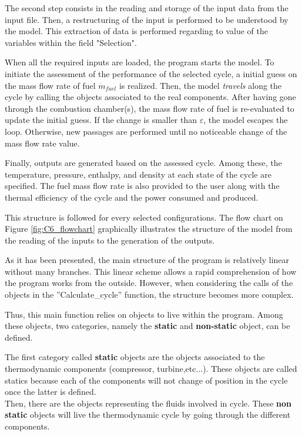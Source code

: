 The second step consists in the reading and storage of the input data from the input file. Then, a restructuring of the input is performed to be understood by the model. This extraction of data is performed regarding to value of the variables within the field "Selection".

When all the required inputs are loaded, the program starts the model. To initiate the assessment of the performance of the selected cycle, a initial guess on the mass flow rate of fuel $\dot{m}_{fuel}$ is realized. Then, the model \textit{travels} along the cycle by calling the objects associated to the real components. 
After having gone through the combustion chamber(s), the mass flow rate of fuel is re-evaluated to update the initial guess. If the change is smaller than $\varepsilon$, the model escapes the loop. Otherwise, new passages are performed until no noticeable change of the mass flow rate value.
   
Finally, outputs are generated based on the assessed cycle. Among these, the temperature, pressure, enthalpy, and density at each state of the cycle are specified. The fuel mass flow rate is also provided to the user along with the thermal efficiency of the cycle and the power consumed and produced. 

This structure is followed for every selected configurations. The flow chart on Figure \ref{fig:C6_flowchart} graphically illustrates the structure of the model from the reading of the inputs to the generation of the outputs.\\ \newpage

As it has been presented, the main structure of the program is relatively linear without many branches. This linear scheme allows a rapid comprehension of how the program works from the outside. However, when considering the calls of the objects in the ''Calculate\_cycle'' function, the structure becomes more complex. 

Thus, this main function relies on objects to live within the program.  Among these objects, two categories, namely the \textbf{static} and \textbf{non-static} object, can be defined.

The first category called \textbf{static} objects are the objects associated to the thermodynamic components (compressor, turbine,etc...). These objects are called statics because each of the components will not change of position in the cycle once the latter is defined. \\

Then, there are the objects representing the fluids involved in cycle. These \textbf{non static} objects will live the thermodynamic cycle by going through the different components.


